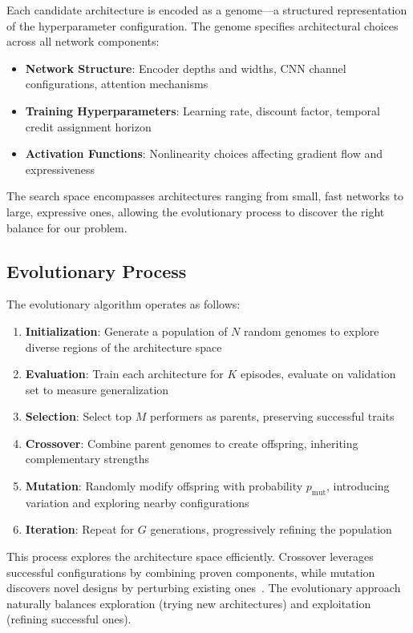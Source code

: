 Each candidate architecture is encoded as a genome---a structured representation of the hyperparameter configuration. The genome specifies architectural choices across all network components:

\begin{itemize}
    \item \textbf{Network Structure}: Encoder depths and widths, CNN channel configurations, attention mechanisms
    \item \textbf{Training Hyperparameters}: Learning rate, discount factor, temporal credit assignment horizon
    \item \textbf{Activation Functions}: Nonlinearity choices affecting gradient flow and expressiveness
\end{itemize}

The search space encompasses architectures ranging from small, fast networks to large, expressive ones, allowing the evolutionary process to discover the right balance for our problem.

\subsection{Evolutionary Process}

The evolutionary algorithm operates as follows:

\begin{enumerate}
    \item \textbf{Initialization}: Generate a population of $N$ random genomes to explore diverse regions of the architecture space
    \item \textbf{Evaluation}: Train each architecture for $K$ episodes, evaluate on validation set to measure generalization
    \item \textbf{Selection}: Select top $M$ performers as parents, preserving successful traits
    \item \textbf{Crossover}: Combine parent genomes to create offspring, inheriting complementary strengths
    \item \textbf{Mutation}: Randomly modify offspring with probability $p_{\text{mut}}$, introducing variation and exploring nearby configurations
    \item \textbf{Iteration}: Repeat for $G$ generations, progressively refining the population
\end{enumerate}

This process explores the architecture space efficiently. Crossover leverages successful configurations by combining proven components, while mutation discovers novel designs by perturbing existing ones~\cite{real2019regularized}. The evolutionary approach naturally balances exploration (trying new architectures) and exploitation (refining successful ones).

